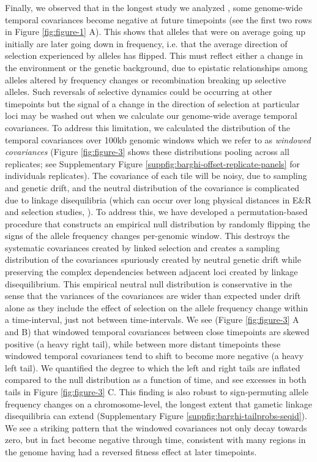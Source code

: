\documentclass[11pt]{article}
\begin{document}
Finally, we observed that in the longest study  we analyzed
\parencite{Barghi2019-qy}, some genome-wide temporal covariances become
negative at future timepoints (see the first two rows in Figure
\ref{fig:figure-1} A). This shows that alleles that were on average going up
initially are later going down in frequency, i.e. that the average direction of
selection experienced by alleles has flipped. This must reflect either a change
in the environment or the genetic background, due to epistatic relationships
among alleles altered by frequency changes or recombination breaking up
selective alleles.  Such reversals of selective dynamics could be occurring at
other timepoints but the signal of a change in the direction of selection at
particular loci may be washed out when we calculate our genome-wide average
temporal covariances. To address this limitation, we calculated the
distribution of the temporal covariances over 100kb genomic windows which we
refer to as \emph{windowed covariances} (Figure \ref{fig:figure-3} shows these
distributions pooling across all replicates; see Supplementary Figure
\ref{suppfig:barghi-offset-replicate-panels} for individuals replicates). The
covariance of each tile will be noisy, due to sampling and genetic drift, and
the neutral distribution of the covariance is complicated due to linkage
disequilibria (which can occur over long physical distances in E\&R and
selection studies, \cite{Nuzhdin2013-gf,Baldwin-Brown2014-cl}). To address
this, we have developed a permutation-based procedure that constructs an
empirical null distribution by randomly flipping the signs of the allele
frequency changes per-genomic window. This destroys the systematic covariances
created by linked selection and creates a sampling distribution of the
covariances spuriously created by neutral genetic drift while preserving the
complex dependencies between adjacent loci created by linkage disequilibrium.
This empirical neutral null distribution is conservative in the sense that the
variances of the covariances are wider than expected under drift alone as they
include the effect of selection on the allele frequency change within a
time-interval, just not between time-intervals. We see (Figure
\ref{fig:figure-3} A and B) that windowed temporal covariances between close
timepoints are skewed positive (a heavy right tail), while between more distant
timepoints these windowed temporal covariances tend to shift to become more
negative (a heavy left tail).  We quantified the degree to which the left and
right tails are inflated compared to the null distribution as a function of
time, and see excesses in both tails in Figure \ref{fig:figure-3} C. This
finding is also robust to sign-permuting allele frequency changes on a
chromosome-level, the longest extent that gametic linkage disequilibria can
extend (Supplementary Figure \ref{suppfig:barghi-tailprobs-seqid}). We see a
striking pattern that the windowed covariances not only decay towards zero, but
in fact become negative through time, consistent with many regions in the
genome having had a reversed fitness effect at later timepoints.
\end{document}
